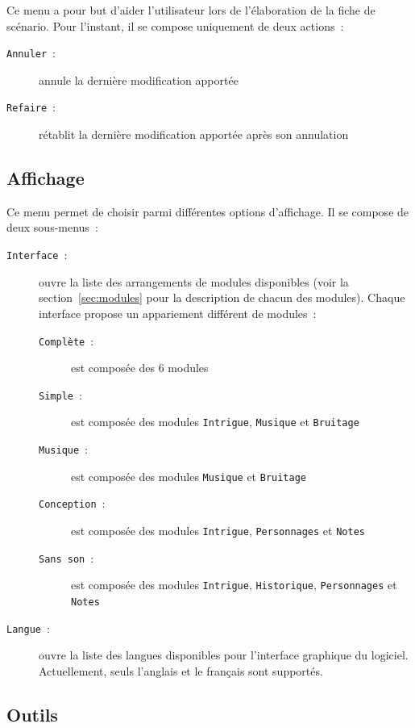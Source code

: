 \documentclass[a4paper,12pt]{article}
\newcommand*{\interfaceitem}[1]{\texttt{#1}}
\begin{document}
Ce menu a pour but d'aider l'utilisateur lors de l'élaboration de la fiche de scénario.
Pour l'instant, il se compose uniquement de deux actions~:
\begin{description}
    \item[\interfaceitem{Annuler}~:]{annule la dernière modification apportée}
    \item[\interfaceitem{Refaire}~:]{rétablit la dernière modification apportée après son annulation}
\end{description}

\subsection{Affichage}
\label{sec:affich}

Ce menu permet de choisir parmi différentes options d'affichage.
Il se compose de deux sous-menus~:
\begin{description}
    \item[\interfaceitem{Interface}~:]{ouvre la liste des arrangements de modules disponibles (voir la section~\ref{sec:modules} pour la description de chacun des modules).
        Chaque interface propose un appariement différent de modules~:
        \begin{description}
            \item[\interfaceitem{Complète}~:]{est composée des 6 modules}
            \item[\interfaceitem{Simple}~:]{est composée des modules \interfaceitem{Intrigue}, \interfaceitem{Musique} et \interfaceitem{Bruitage}}
            \item[\interfaceitem{Musique}~:]{est composée des modules \interfaceitem{Musique} et \interfaceitem{Bruitage}}
            \item[\interfaceitem{Conception}~:]{est composée des modules \interfaceitem{Intrigue}, \interfaceitem{Personnages} et \interfaceitem{Notes}}
            \item[\interfaceitem{Sans son}~:]{est composée des modules \interfaceitem{Intrigue}, \interfaceitem{Historique}, \interfaceitem{Personnages} et \interfaceitem{Notes}}
        \end{description}
    }
    \item[\interfaceitem{Langue}~:]{ouvre la liste des langues disponibles pour l'interface graphique du logiciel.
        Actuellement, seuls l'anglais et le français sont supportés.}
\end{description}

\subsection{Outils}
\label{sec:menu_outils}
\end{document}
